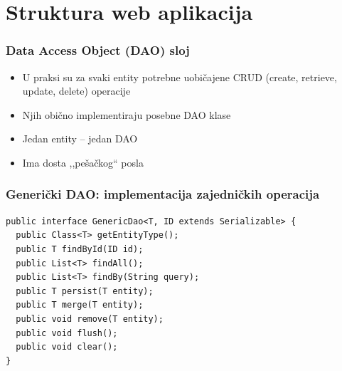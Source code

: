 \documentclass[compress]{beamer}
\begin{document}
\section[Webapps]{Struktura web aplikacija}
\begin{frame}
  \frametitle{Data Access Object (DAO) sloj}
  \begin{itemize}
    \item U praksi su za svaki entity potrebne uobičajene CRUD (create, retrieve, update, delete) operacije
    \item Njih obično implementiraju posebne DAO klase
    \item Jedan entity -- jedan DAO
    \item Ima dosta ,,pešačkog`` posla
  \end{itemize}
\end{frame}
\begin{frame}[fragile]
  \frametitle{Generički DAO: implementacija zajedničkih operacija}
\begin{verbatim}
public interface GenericDao<T, ID extends Serializable> {
  public Class<T> getEntityType();
  public T findById(ID id);
  public List<T> findAll();
  public List<T> findBy(String query);
  public T persist(T entity);
  public T merge(T entity);
  public void remove(T entity);
  public void flush();
  public void clear();
}
\end{verbatim}
\end{frame}
\end{document}
